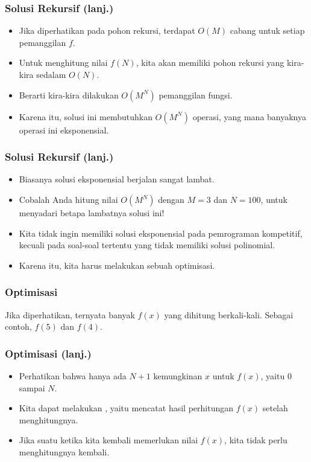 \begin{frame}
\frametitle{Solusi Rekursif (lanj.)}
\begin{itemize}
  \item Jika diperhatikan pada pohon rekursi, terdapat $O(M)$ cabang untuk setiap pemanggilan $f$.
  \item Untuk menghitung nilai $f(N)$, kita akan memiliki pohon rekursi yang kira-kira sedalam $O(N)$.
  \item Berarti kira-kira dilakukan $O(M^N)$ pemanggilan fungsi.
  \item Karena itu, solusi ini membutuhkan $O(M^N)$ operasi, yang mana banyaknya operasi ini eksponensial.
\end{itemize}
\end{frame}

\begin{frame}
\frametitle{Solusi Rekursif (lanj.)}
\begin{itemize}
  \item Biasanya solusi eksponensial berjalan sangat lambat.
  \item Cobalah Anda hitung nilai $O(M^N)$ dengan $M=3$ dan $N=100$, untuk menyadari betapa lambatnya solusi ini!
  \item Kita tidak ingin memiliki solusi eksponensial pada pemrograman kompetitif, kecuali pada soal-soal tertentu  yang tidak memiliki solusi polinomial. 
  \item Karena itu, kita harus melakukan sebuah optimisasi.
\end{itemize}
\end{frame}

\begin{frame}
\frametitle{Optimisasi}
Jika diperhatikan, ternyata banyak $f(x)$ yang dihitung berkali-kali. Sebagai contoh, $f(5)$ dan $f(4)$.
\begin{center}
\scalebox{0.8}{
\Tree [.$f(12)$
  [.$f(2)$
    [.$f(1)$
      [.$f(0)$ ]
    ]
  ]
  [.$f(6)$
    [.$f(0)$ ]
    [.$f(5)$
      [.$f(4)$
        [.$...$
        ]
      ]
    ]
  ]
  [.$f(11)$
    [.$f(1)$
      [.$f(0)$ ]
    ]
    [.$f(5)$
      [.$f(4)$
        [.$...$          
        ]
      ]
    ]
    [.$f(10)$ 
      [.$f(0)$ 
        [.$...$ ]      
      ]
      [.$f(4)$ 
        [.$...$ ]      
      ]
      [.$f(9)$ 
        [.$...$ ]      
      ]
    ]
  ]
]
}
\end{center}
\end{frame}

\begin{frame}
\frametitle{Optimisasi (lanj.)}
\begin{itemize}
  \item Perhatikan bahwa hanya ada $N + 1$ kemungkinan $x$ untuk $f(x)$, yaitu $0$ sampai $N$.
  
  \item Kita dapat melakukan , yaitu mencatat hasil perhitungan $f(x)$ setelah menghitungnya.
  \item Jika suatu ketika kita kembali memerlukan nilai $f(x)$, kita tidak perlu menghitungnya kembali.
\end{itemize}
\end{frame}

